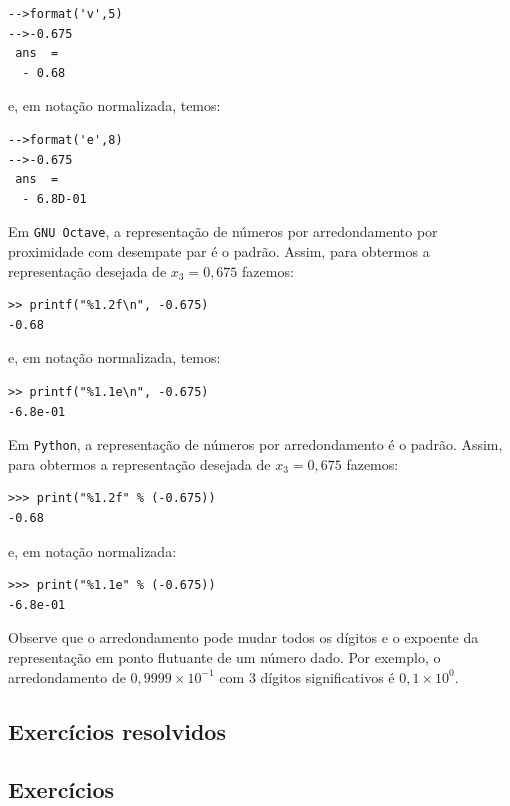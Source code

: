 \begin{sol}
\begin{itemize}
\begin{verbatim}
-->format('v',5)
-->-0.675
 ans  =
  - 0.68
\end{verbatim}
e, em notação normalizada, temos:
\begin{verbatim}
-->format('e',8)
-->-0.675
 ans  =
  - 6.8D-01
\end{verbatim}
\fi
\ifisoctave
Em \verb+GNU Octave+, a representação de números por arredondamento por proximidade com desempate par é o padrão. Assim, para obtermos a representação desejada de $x_3 = 0,675$ fazemos:
\begin{verbatim}
>> printf("%1.2f\n", -0.675)
-0.68
\end{verbatim}
e, em notação normalizada, temos:
\begin{verbatim}
>> printf("%1.1e\n", -0.675)
-6.8e-01
\end{verbatim}
\fi
\ifispython
Em \verb+Python+, a representação de números por arredondamento é o padrão. Assim, para obtermos a representação desejada de $x_3 = 0,675$ fazemos:
\begin{verbatim}
>>> print("%1.2f" % (-0.675))
-0.68
\end{verbatim}
e, em notação normalizada:
\begin{verbatim}
>>> print("%1.1e" % (-0.675))
-6.8e-01
\end{verbatim}
\fi
  \end{itemize}
\end{sol}

\begin{obs}
  Observe que o arredondamento pode mudar todos os dígitos e o expoente da representação em ponto flutuante de um número dado. Por exemplo, o arredondamento de $0,9999\times 10^{-1}$ com $3$ dígitos significativos é $0,1\times 10^{0}$.
\end{obs}

\subsection*{Exercícios resolvidos}

\construirExeresol

\subsection*{Exercícios}

